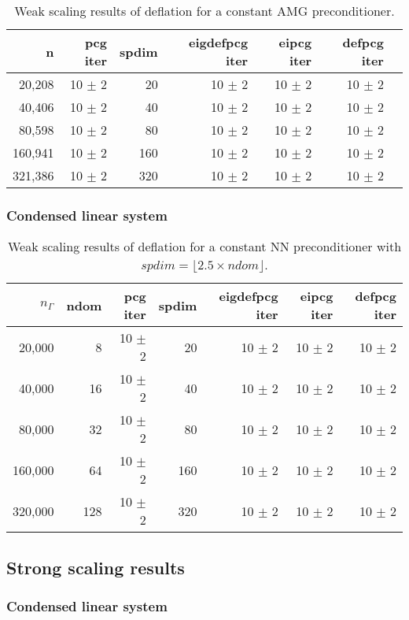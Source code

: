 \documentclass{article}
\begin{document}
\begin{table}[ht]
	\caption{Weak scaling results of deflation for a constant AMG preconditioner.}
	\centering
	\begin{tabular}{|r|r|r|r|r|r|r|}
		\hline
		n & pcg iter & spdim & eigdefpcg iter & eipcg iter & defpcg iter\\
		\hline
		20,208  &  10 $\pm$ 2 & 20 & 10 $\pm$ 2 & 10 $\pm$ 2 & 10 $\pm$ 2 \\
		40,406  & 10 $\pm$ 2 & 40 & 10 $\pm$ 2 & 10 $\pm$ 2 & 10 $\pm$ 2 \\
		80,598  & 10 $\pm$ 2 & 80 & 10 $\pm$ 2 & 10 $\pm$ 2 & 10 $\pm$ 2 \\
		160,941 & 10 $\pm$ 2 & 160 & 10 $\pm$ 2 & 10 $\pm$ 2 & 10 $\pm$ 2 \\
		321,386 & 10 $\pm$ 2 & 320 & 10 $\pm$ 2 & 10 $\pm$ 2 & 10 $\pm$ 2 \\
		\hline
	\end{tabular}
	\label{Tab:020}
\end{table}

\subsubsection{Condensed linear system}

\begin{table}[ht]
	\caption{Weak scaling results of deflation for a constant NN preconditioner with $spdim=\lfloor 2.5 \times ndom\rfloor$.}
	\centering
	\begin{tabular}{|r|r|r|r|r|r|r|}
		\hline
		$n_\Gamma$ & ndom & pcg iter & spdim & eigdefpcg iter & eipcg iter & defpcg iter\\
		\hline
		20,000  &   8 & 10 $\pm$ 2 & 20 & 10 $\pm$ 2 & 10 $\pm$ 2 & 10 $\pm$ 2 \\
		40,000  &  16 & 10 $\pm$ 2 & 40 & 10 $\pm$ 2 & 10 $\pm$ 2 & 10 $\pm$ 2 \\
		80,000  &  32 & 10 $\pm$ 2 & 80 & 10 $\pm$ 2 & 10 $\pm$ 2 & 10 $\pm$ 2 \\
		160,000 &  64 & 10 $\pm$ 2 & 160 & 10 $\pm$ 2 & 10 $\pm$ 2 & 10 $\pm$ 2 \\
		320,000 & 128 & 10 $\pm$ 2 & 320 & 10 $\pm$ 2 & 10 $\pm$ 2 & 10 $\pm$ 2 \\
		\hline
	\end{tabular}
	\label{Tab:025}
\end{table}

\subsection{Strong scaling results}



\subsubsection{Condensed linear system}
\end{document}

